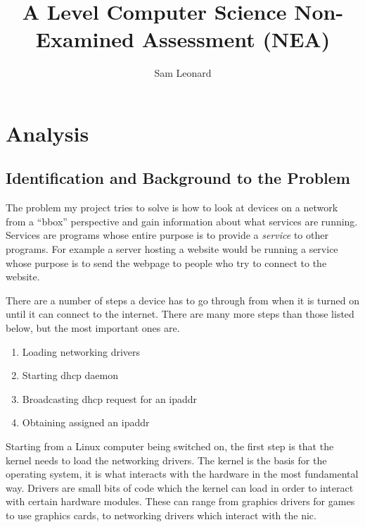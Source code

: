 \documentclass[titlepage]{article}
\author{Sam Leonard}
\title{A Level Computer Science Non-Examined Assessment (NEA)}
\date{} %
\let\Oldsection\section{}
\renewcommand{\section}{\FloatBarrier\Oldsection}
\let\Oldsubsection\subsection{}
\renewcommand{\subsection}{\FloatBarrier\Oldsubsection}
\begin{document}
\maketitle

\tableofcontents

\clearpage

\setlength{\parskip}{6pt plus 1pt minus 1pt}

\section{Analysis}

\subsection{Identification and Background to the Problem}

The problem my project tries to solve is how to look at devices on a network from a 
``\gls{bbox}'' perspective and gain information about what \glspl{service} are running.
Services are programs whose entire purpose is to provide a \textit{\gls{service}} to other programs.
For example a server hosting a website would be running a \gls{service} whose purpose is to send the 
webpage to people who try to connect to the website.

There are a number of steps a device has to go through from when it is turned on until it
can connect to the internet.
There are many more steps than those listed below, but the most important ones are.

\begin{enumerate}
  \item{Loading networking \glspl{driver}}
  \item{Starting \gls{dhcp} \gls{daemon}}
  \item{Broadcasting \gls{dhcp} request for an \gls{ipaddr}}
  \item{Obtaining assigned an \gls{ipaddr}}
\end{enumerate}

Starting from a Linux computer being switched on, the first step is that the \gls{kernel} needs to load the 
networking \glspl{driver}. The \gls{kernel} is the basis for the operating system, it is what 
interacts with the hardware in the most fundamental way. Drivers are small bits of code which 
the \gls{kernel} can load in order to interact with certain hardware modules.
These can range from graphics drivers for games to use graphics cards, to networking drivers
which interact with the \gls{nic}.
\end{document}
